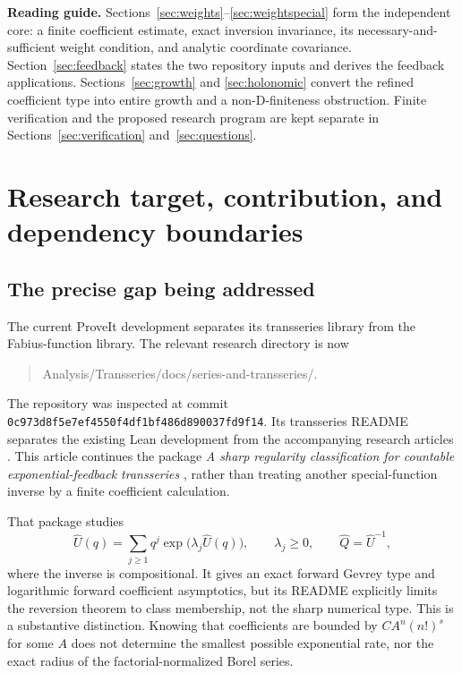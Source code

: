 \documentclass[11pt,a4paper]{article}
\numberwithin{equation}{section}
\theoremstyle{definition}
\theoremstyle{remark}
\newcommand{\Q}{\widehat Q}
\newcommand{\U}{\widehat U}
\newcommand{\commit}{\nolinkurl{0c973d8f5e7ef4550f4df1bf486d890037fd9f14}}
\begin{document}
\hypersetup{pageanchor=true}
\setcounter{tocdepth}{1}
\tableofcontents
\vspace{9mm}
\noindent\textbf{Reading guide.}
Sections~\ref{sec:weights}--\ref{sec:weightspecial} form the independent
core: a finite coefficient estimate, exact inversion invariance, its
necessary-and-sufficient weight condition, and analytic coordinate
covariance. Section~\ref{sec:feedback} states the two repository inputs
and derives the feedback applications. Sections~\ref{sec:growth} and
\ref{sec:holonomic} convert the refined coefficient type into entire
growth and a non-D-finiteness obstruction. Finite verification and the
proposed research program are kept separate in
Sections~\ref{sec:verification} and~\ref{sec:questions}.
\clearpage

\section{Research target, contribution, and dependency boundaries}
\label{sec:context}

\subsection{The precise gap being addressed}

The current ProveIt development separates its transseries library from the
Fabius-function library. The relevant research directory is now
\begin{quote}\small\ttfamily
Analysis/Transseries/docs/series-and-transseries/.
\end{quote}
The repository was inspected at commit \commit. Its transseries README
separates the existing Lean development from the accompanying research
articles \cite{repo,reporeadme}. This article continues the package
\emph{A sharp regularity classification for countable exponential-feedback
transseries} \cite{feedback}, rather than treating another special-function
inverse by a finite coefficient calculation.

That package studies
\begin{equation}
 \U(q)=\sum_{j\ge1}q^j\exp\bigl(\lambda_j\U(q)\bigr),
 \qquad \lambda_j\ge0,\qquad \Q=\U^{-1},
 \label{eq:modelintro}
\end{equation}
where the inverse is compositional. It gives an exact forward Gevrey type
and logarithmic forward coefficient asymptotics, but its README explicitly
limits the reversion theorem to class membership, not the sharp numerical
type. This is a substantive distinction. Knowing that coefficients are
bounded by $CA^n(n!)^s$ for some $A$ does not determine the smallest possible
exponential rate, nor the exact radius of the factorial-normalized Borel
series.
\end{document}
